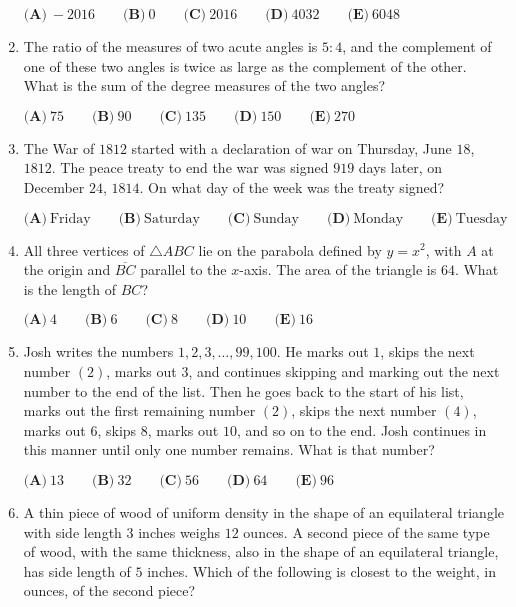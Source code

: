 \documentclass{article}
\begin{document}
\begin{enumerate}[label=\arabic*., itemsep=0.5em]
\(\textbf{(A)}\ -2016\qquad\textbf{(B)}\ 0\qquad\textbf{(C)}\ 2016\qquad\textbf{(D)}\ 4032\qquad\textbf{(E)}\ 6048\)\par \vspace{0.5em}\item The ratio of the measures of two acute angles is \(5:4\), and the complement of one of these two angles is twice as large as the complement of the other. What is the sum of the degree measures of the two angles?

\(\textbf{(A)}\ 75\qquad\textbf{(B)}\ 90\qquad\textbf{(C)}\ 135\qquad\textbf{(D)}\ 150\qquad\textbf{(E)}\ 270\)\par \vspace{0.5em}\item The War of \(1812\) started with a declaration of war on Thursday, June \(18\), \(1812\). The peace treaty to end the war was signed \(919\) days later, on December \(24\), \(1814\). On what day of the week was the treaty signed? 

\(\textbf{(A)}\ \text{Friday} \qquad
\textbf{(B)}\ \text{Saturday} \qquad
\textbf{(C)}\ \text{Sunday} \qquad
\textbf{(D)}\ \text{Monday} \qquad
\textbf{(E)}\ \text{Tuesday} \)\par \vspace{0.5em}\item All three vertices of \(\bigtriangleup ABC\) lie on the parabola defined by \(y=x^2\), with \(A\) at the origin and \(\overline{BC}\) parallel to the \(x\)-axis. The area of the triangle is \(64\). What is the length of \(BC\)?  

\(\textbf{(A)}\ 4\qquad\textbf{(B)}\ 6\qquad\textbf{(C)}\ 8\qquad\textbf{(D)}\ 10\qquad\textbf{(E)}\ 16\)\par \vspace{0.5em}\item Josh writes the numbers \(1,2,3,\dots,99,100\). He marks out \(1\), skips the next number \((2)\), marks out \(3\), and continues skipping and marking out the next number to the end of the list. Then he goes back to the start of his list, marks out the first remaining number \((2)\), skips the next number \((4)\), marks out \(6\), skips \(8\), marks out \(10\), and so on to the end. Josh continues in this manner until only one number remains. What is that number?

\(\textbf{(A)}\ 13 \qquad
\textbf{(B)}\ 32 \qquad
\textbf{(C)}\ 56 \qquad
\textbf{(D)}\ 64 \qquad
\textbf{(E)}\ 96\)\par \vspace{0.5em}\item A thin piece of wood of uniform density in the shape of an equilateral triangle with side length \(3\) inches weighs \(12\) ounces. A second piece of the same type of wood, with the same thickness, also in the shape of an equilateral triangle, has side length of \(5\) inches. Which of the following is closest to the weight, in ounces, of the second piece?


\end{enumerate}
\end{document}
